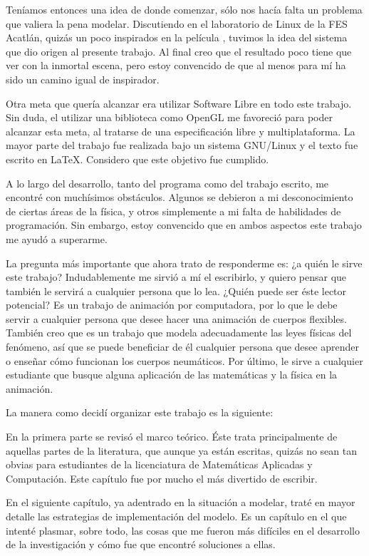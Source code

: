 Teníamos entonces una idea de donde comenzar, sólo nos hacía falta un problema que valiera la pena modelar.
Discutiendo en el laboratorio de Linux de la FES Acatlán, quizás un poco inspirados en la película , tuvimos la idea del sistema que dio origen al presente trabajo.
Al final creo que el resultado poco tiene que ver con la inmortal escena, pero estoy convencido de que al menos para mí ha sido un camino igual de inspirador.

Otra meta que quería alcanzar era utilizar Software Libre en todo este trabajo. 
Sin duda, el utilizar una biblioteca como OpenGL me favoreció para poder alcanzar esta meta, al tratarse de una especificación libre y multiplataforma.
La mayor parte del trabajo fue realizada bajo un sistema GNU/Linux y el texto fue escrito en \LaTeX. Considero que este objetivo fue cumplido.

A lo largo del desarrollo, tanto del programa como del trabajo escrito, me encontré con muchísimos obstáculos.
Algunos se debieron a mi desconocimiento de ciertas áreas de la física, y otros simplemente a mi falta de habilidades de programación.
Sin embargo, estoy convencido que en ambos aspectos este trabajo me ayudó a superarme.

La pregunta más importante que ahora trato de responderme es: ¿a quién le sirve este trabajo?
Indudablemente me sirvió a mí el escribirlo, y quiero pensar que también le servirá a cualquier persona que lo lea.
¿Quién puede ser éste lector potencial?
Es un trabajo de animación por computadora, por lo que le debe servir a cualquier persona que desee hacer una animación de cuerpos flexibles.
También creo que es un trabajo que modela adecuadamente las leyes físicas del fenómeno, así que se puede beneficiar de él cualquier persona que desee aprender o enseñar cómo funcionan los cuerpos neumáticos.
Por último, le sirve a cualquier estudiante que busque alguna aplicación de las matemáticas y la física en la animación.

La manera como decidí organizar este trabajo es la siguiente:

En la primera parte se revisó el marco teórico.
Éste trata principalmente de aquellas partes de la literatura, que aunque ya están escritas, quizás no sean tan obvias para estudiantes de la licenciatura de Matemáticas Aplicadas y Computación.
Este capítulo fue por mucho el más divertido de escribir.

En el siguiente capítulo, ya adentrado en la situación a modelar, traté en mayor detalle las estrategias de implementación del modelo.
Es un capítulo en el que intenté plasmar, sobre todo, las cosas que me fueron más difíciles en el desarrollo de la investigación y cómo fue que encontré soluciones a ellas.

